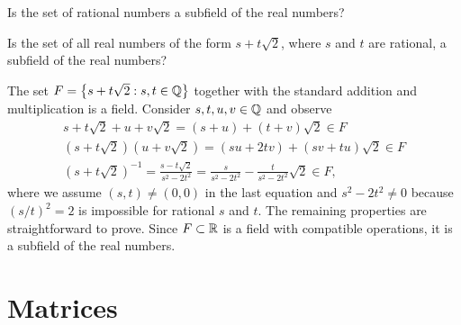 \begin{problem} \label{problem:RationalNumbers}
Is the set of rational numbers a subfield of the real numbers?
\end{problem}

\begin{example}
Is the set of all real numbers of the form $s + t \sqrt{2}$, where $s$ and $t$ are rational, a subfield of the real numbers?

The set $F = \left\{ s + t \sqrt{2} : s, t \in \mathbb{Q} \right\}$ together with the standard addition and multiplication is a field.
Consider $s, t, u, v \in \mathbb{Q}$ and observe
\begin{gather*}
s + t \sqrt{2} + u + v \sqrt{2} = (s+u) + (t+v) \sqrt{2} \in F \\
\left( s + t \sqrt{2} \right) \left( u + v \sqrt{2} \right) = (su + 2 tv) + (sv + tu) \sqrt{2} \in F \\
\left( s + t \sqrt{2} \right)^{-1} = \frac{ s - t \sqrt{2} }{ s^2 - 2 t^2 }
= \frac{ s }{ s^2 - 2 t^2 } - \frac{ t }{ s^2 - 2 t^2 } \sqrt{2} \in F,
\end{gather*}
where we assume $(s,t)\neq(0,0)$ in the last equation and $s^2-2t^2\ne0$ because $(s/t)^2=2$ is impossible for rational $s$ and $t$.
The remaining properties are straightforward to prove.
Since $F \subset \mathbb{R}$ is a field with compatible operations, it is a subfield of the real numbers.
\end{example}


\section{Matrices}

